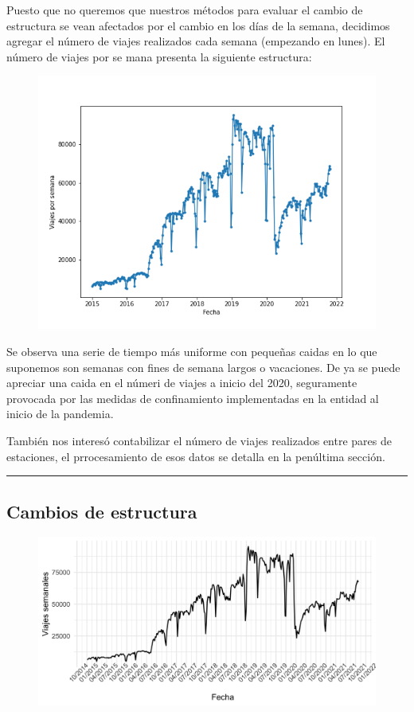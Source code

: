 \documentclass[
]{article}
\begin{document}
Puesto que no queremos que nuestros métodos para evaluar el cambio de
estructura se vean afectados por el cambio en los días de la semana,
decidimos agregar el número de viajes realizados cada semana (empezando
en lunes). El número de viajes por se mana presenta la siguiente
estructura:

\begin{figure}
\centering
\includegraphics{../plots/trips_weekly.png}
\caption{}
\end{figure}

Se observa una serie de tiempo más uniforme con pequeñas caidas en lo
que suponemos son semanas con fines de semana largos o vacaciones. De ya
se puede apreciar una caida en el númeri de viajes a inicio del 2020,
seguramente provocada por las medidas de confinamiento implementadas en
la entidad al inicio de la pandemia.

También nos interesó contabilizar el número de viajes realizados entre
pares de estaciones, el prrocesamiento de esos datos se detalla en la
penúltima sección.

\begin{center}\rule{0.5\linewidth}{0.5pt}\end{center}
\newpage
\hypertarget{cambios-de-estructura}{%
\subsection{Cambios de estructura}\label{cambios-de-estructura}}

\begin{figure}
\centering
\includegraphics{../plots/serie1.png}
\caption{}
\end{figure}
\end{document}

